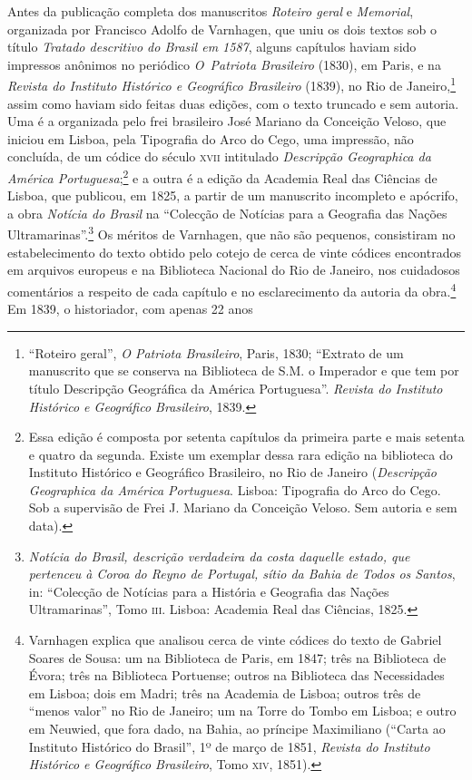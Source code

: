Antes da publicação completa dos manuscritos \textit{Roteiro geral} e
\textit{Memorial}, organizada  por Francisco Adolfo de Varnhagen, que
uniu os dois textos sob o título \textit{Tratado descritivo do Brasil
em 1587}, alguns capítulos haviam sido impressos anônimos no periódico
\textit{O~Patriota Brasileiro} (1830), em Paris, e na \textit{Revista
do Instituto Histórico e Geográfico Brasileiro} (1839), no Rio de
Janeiro,\footnote{ “Roteiro geral”, \textit{O Patriota Brasileiro},
Paris, 1830; “Extrato de um manuscrito que se conserva na Biblioteca de
S.M. o Imperador e que tem por título Descripção Geográfica da América
Portuguesa”. \textit{Revista do Instituto Histórico e Geográfico
Brasileiro}, 1839.} assim como haviam sido feitas duas edições, com o
texto truncado e sem autoria. Uma é a organizada pelo frei brasileiro
José Mariano da Conceição Veloso, que iniciou em Lisboa, pela
Tipografia do Arco do Cego, uma impressão, não concluída, de um códice
do século \textsc{xvii} intitulado \textit{Descripção Geographica da América
Portuguesa};\footnote{ Essa edição é composta por setenta capítulos da
primeira parte e mais setenta e quatro da segunda. Existe um exemplar
dessa rara edição na biblioteca do Instituto Histórico e Geográfico
Brasileiro, no Rio de Janeiro (\textit{Descripção Geographica da América
Portuguesa}. Lisboa: Tipografia do Arco do Cego. Sob a supervisão de
Frei J. Mariano da Conceição Veloso. Sem autoria e sem data).} e a outra
é a edição da Academia Real das Ciências de Lisboa, que publicou, em
1825, a partir de um manuscrito incompleto e apócrifo, a obra
\textit{Notícia do Brasil} na ``Colecção de Notícias para a
Geografia das Nações Ultramarinas''.\footnote{ \textit{Notícia
do Brasil, descrição verdadeira da costa daquelle estado, que pertenceu
à Coroa do Reyno de Portugal, sítio da Bahia de Todos os Santos}, in:
``Colecção de Notícias para a História e Geografia das Nações
Ultramarinas'', Tomo \textsc{iii}. Lisboa: Academia Real das
Ciências, 1825.} Os méritos de Varnhagen, que não são pequenos,
consistiram no estabelecimento do texto obtido pelo cotejo de cerca de
vinte códices encontrados em arquivos europeus e na Biblioteca Nacional
do Rio de Janeiro, nos cuidadosos comentários a respeito de cada
capítulo e no esclarecimento da autoria da obra.\footnote{ Varnhagen
explica que analisou cerca de vinte códices do texto de Gabriel Soares de
Sousa: um na Biblioteca de Paris, em 1847; três na Biblioteca de Évora;
três na Biblioteca Portuense; outros na Biblioteca das Necessidades em
Lisboa; dois em Madri; três na Academia de Lisboa; outros três de
“menos valor” no Rio de Janeiro; um na Torre do Tombo em Lisboa; e
outro em Neuwied, que fora dado, na Bahia, ao príncipe Maximiliano
(“Carta ao Instituto Histórico do Brasil”, 1º de março de 1851, \textit{Revista do Instituto Histórico e
Geográfico Brasileiro},
Tomo \textsc{xiv}, 1851).}  Em 1839, o historiador, com apenas 22 anos
